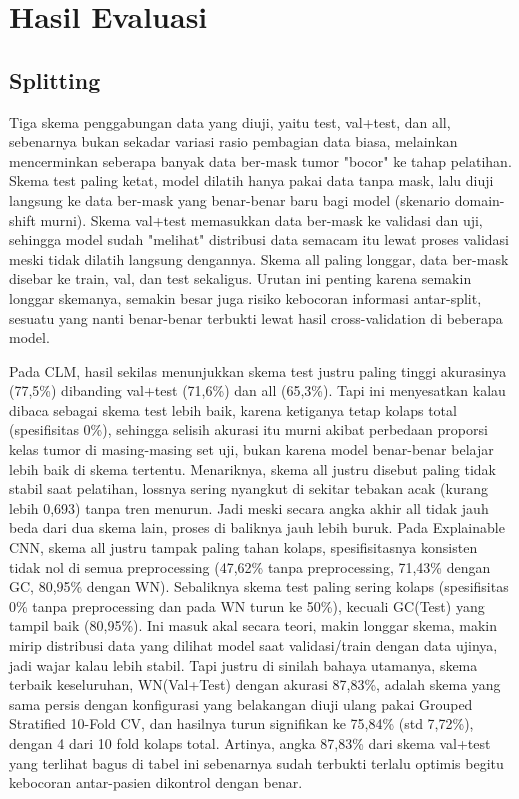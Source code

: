 \section{Hasil Evaluasi}

\subsection{Splitting}
\label{subsec:splitting}
Tiga skema penggabungan data yang diuji, yaitu test, val+test, dan all, sebenarnya bukan sekadar variasi rasio pembagian data biasa, melainkan mencerminkan seberapa banyak data ber-mask tumor "bocor" ke tahap pelatihan. Skema test paling ketat, model dilatih hanya pakai data tanpa mask, lalu diuji langsung ke data ber-mask yang benar-benar baru bagi model (skenario domain-shift murni). Skema val+test memasukkan data ber-mask ke validasi dan uji, sehingga model sudah "melihat" distribusi data semacam itu lewat proses validasi meski tidak dilatih langsung dengannya. Skema all paling longgar, data ber-mask disebar ke train, val, dan test sekaligus. Urutan ini penting karena semakin longgar skemanya, semakin besar juga risiko kebocoran informasi antar-split, sesuatu yang nanti benar-benar terbukti lewat hasil cross-validation di beberapa model.

Pada CLM, hasil sekilas menunjukkan skema test justru paling tinggi akurasinya (77,5\%) dibanding val+test (71,6\%) dan all (65,3\%). Tapi ini menyesatkan kalau dibaca sebagai skema test lebih baik, karena ketiganya tetap kolaps total (spesifisitas 0\%), sehingga selisih akurasi itu murni akibat perbedaan proporsi kelas tumor di masing-masing set uji, bukan karena model benar-benar belajar lebih baik di skema tertentu. Menariknya, skema all justru disebut paling tidak stabil saat pelatihan, lossnya sering nyangkut di sekitar tebakan acak (kurang lebih 0,693) tanpa tren menurun. Jadi meski secara angka akhir all tidak jauh beda dari dua skema lain, proses di baliknya jauh lebih buruk.
Pada Explainable CNN, skema all justru tampak paling tahan kolaps, spesifisitasnya konsisten tidak nol di semua preprocessing (47,62\% tanpa preprocessing, 71,43\% dengan GC, 80,95\% dengan WN). Sebaliknya skema test paling sering kolaps (spesifisitas 0\% tanpa preprocessing dan pada WN turun ke 50\%), kecuali GC(Test) yang tampil baik (80,95\%). Ini masuk akal secara teori, makin longgar skema, makin mirip distribusi data yang dilihat model saat validasi/train dengan data ujinya, jadi wajar kalau lebih stabil. Tapi justru di sinilah bahaya utamanya, skema terbaik keseluruhan, WN(Val+Test) dengan akurasi 87,83\%, adalah skema yang sama persis dengan konfigurasi yang belakangan diuji ulang pakai Grouped Stratified 10-Fold CV, dan hasilnya turun signifikan ke 75,84\% (std 7,72\%), dengan 4 dari 10 fold kolaps total. Artinya, angka 87,83\% dari skema val+test yang terlihat bagus di tabel ini sebenarnya sudah terbukti terlalu optimis begitu kebocoran antar-pasien dikontrol dengan benar.

